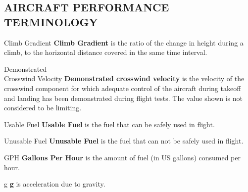 \subsection{AIRCRAFT PERFORMANCE TERMINOLOGY} 
\begin{Description}
	\item [Climb Gradient] \textbf{Climb Gradient} is the ratio of the change in height during a climb, to the horizontal distance covered in the same time interval. 
	\item [Demonstrated \\
	Crosswind Velocity] \textbf{Demonstrated crosswind velocity} is the velocity of the crosswind component for which adequate control of the aircraft during takeoff and landing has been demonstrated during flight tests. The value shown is not considered to be limiting.
	
	
	\item[Usable Fuel]\textbf{Usable Fuel} is the fuel that can be safely used in flight. 
	\item[Unusable Fuel]\textbf{Unusable Fuel} is the fuel that can not be safely used in flight. 
	\item[GPH]\textbf{Gallons Per Hour} is the amount of fuel (in US gallons) consumed per hour.
	
	
	\item[g]\textbf{g} is acceleration due to gravity. 
\end{Description}

